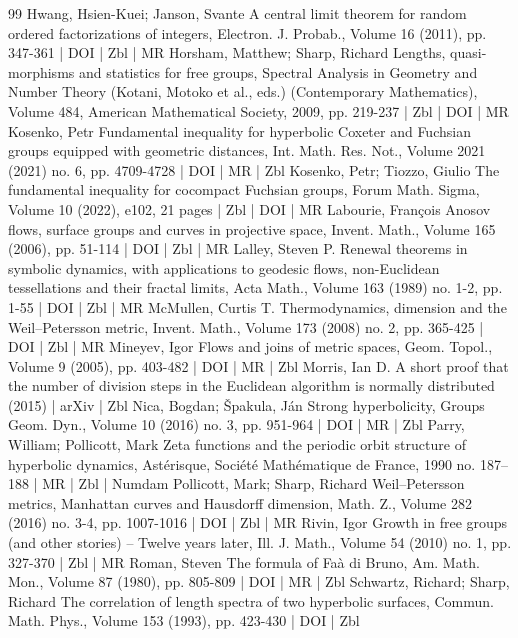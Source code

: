 \begin{thebibliography}{99}
 Hwang, Hsien-Kuei; Janson, Svante A central limit theorem for random ordered factorizations of integers, Electron. J. Probab., Volume 16 (2011), pp. 347-361 | DOI | Zbl | MR
 Horsham, Matthew; Sharp, Richard Lengths, quasi-morphisms and statistics for free groups, Spectral Analysis in Geometry and Number Theory (Kotani, Motoko et al., eds.) (Contemporary Mathematics), Volume 484, American Mathematical Society, 2009, pp. 219-237 | Zbl | DOI | MR
 Kosenko, Petr Fundamental inequality for hyperbolic Coxeter and Fuchsian groups equipped with geometric distances, Int. Math. Res. Not., Volume 2021 (2021) no. 6, pp. 4709-4728 | DOI | MR | Zbl
 Kosenko, Petr; Tiozzo, Giulio The fundamental inequality for cocompact Fuchsian groups, Forum Math. Sigma, Volume 10 (2022), e102, 21 pages | Zbl | DOI | MR
 Labourie, François Anosov flows, surface groups and curves in projective space, Invent. Math., Volume 165 (2006), pp. 51-114 | DOI | Zbl | MR
 Lalley, Steven P. Renewal theorems in symbolic dynamics, with applications to geodesic flows, non-Euclidean tessellations and their fractal limits, Acta Math., Volume 163 (1989) no. 1-2, pp. 1-55 | DOI | Zbl | MR
 McMullen, Curtis T. Thermodynamics, dimension and the Weil–Petersson metric, Invent. Math., Volume 173 (2008) no. 2, pp. 365-425 | DOI | Zbl | MR
 Mineyev, Igor Flows and joins of metric spaces, Geom. Topol., Volume 9 (2005), pp. 403-482 | DOI | MR | Zbl
 Morris, Ian D. A short proof that the number of division steps in the Euclidean algorithm is normally distributed (2015) | arXiv | Zbl
 Nica, Bogdan; Špakula, Ján Strong hyperbolicity, Groups Geom. Dyn., Volume 10 (2016) no. 3, pp. 951-964 | DOI | MR | Zbl
 Parry, William; Pollicott, Mark Zeta functions and the periodic orbit structure of hyperbolic dynamics, Astérisque, Société Mathématique de France, 1990 no. 187–188 | MR | Zbl | Numdam
 Pollicott, Mark; Sharp, Richard Weil–Petersson metrics, Manhattan curves and Hausdorff dimension, Math. Z., Volume 282 (2016) no. 3-4, pp. 1007-1016 | DOI | Zbl | MR
 Rivin, Igor Growth in free groups (and other stories) – Twelve years later, Ill. J. Math., Volume 54 (2010) no. 1, pp. 327-370 | Zbl | MR
 Roman, Steven The formula of Faà di Bruno, Am. Math. Mon., Volume 87 (1980), pp. 805-809 | DOI | MR | Zbl
 Schwartz, Richard; Sharp, Richard The correlation of length spectra of two hyperbolic surfaces, Commun. Math. Phys., Volume 153 (1993), pp. 423-430 | DOI | Zbl
\end{thebibliography}
